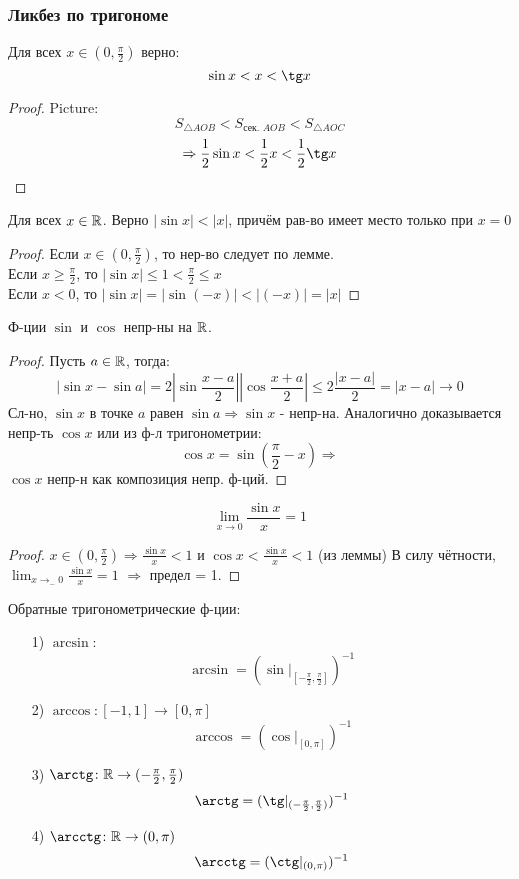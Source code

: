 \subsubsection{Ликбез по тригономе}
\begin{lemma}
Для всех $x \in (0, \frac{\pi}{2})$ верно:
\[
\sin x < x < \tg x
\]
\end{lemma}
\begin{proof}
Picture:
\[
S_{\triangle AOB} < S_{\text{сек. } AOB} < S_{\triangle AOC}
\]
\[
\Rightarrow \frac{1}{2}\sin x < \frac{1}{2} x < \frac{1}{2}\tg x
\]
\end{proof}
\begin{consequence}
Для всех $x \in \mathbb{R}$. Верно $\left|\sin x\right| < \left| x\right|$, причём рав-во имеет место только при $x = 0$
\end{consequence}
\begin{proof}
Если $x \in (0, \frac{\pi}{2})$, то нер-во следует по лемме. \\
Если $x \geq \frac{\pi}{2}$, то $\left|\sin x\right| \leq 1 < \frac{\pi}{2} \leq x$ \\
Если $x < 0$, то $\left|\sin x\right| = \left|\sin (-x)\right| < \left| (-x)\right| = \left| x\right|$
\end{proof}
\begin{consequence}
Ф-ции $\sin$ и $\cos$ непр-ны на $\mathbb{R}$.
\end{consequence}
\begin{proof}
Пусть $a \in \mathbb{R}$, тогда:
\[
\left|\sin x - \sin a\right| = 2\left|\sin \frac{x - a}{2}\right|\left|\cos \frac{x + a}{2}\right| \leq 2\frac{\left|x - a\right|}{2} = \left|x - a\right| \rightarrow 0
\]
Сл-но, $\sin x$ в точке $a$ равен $\sin a \Rightarrow \sin x$ - непр-на. Аналогично доказывается непр-ть $\cos x$ или из ф-л тригонометрии:
\[
  \cos x = \sin(\frac{\pi}{2} - x) \Rightarrow
\]
$\cos x$ непр-н как композиция непр. ф-ций.
\end{proof}
\begin{consequence}
\[
\lim_{x\to 0} \frac{\sin x}{x} = 1
\]
\end{consequence}
\begin{proof}
$x \in (0, \frac{\pi}{2}) \Rightarrow \frac{\sin x}{x} < 1$ и $\cos x < \frac{\sin x}{x} < 1$ (из леммы)
В силу чётности, $\lim_{x\to_-0} \frac{\sin x}{x} = 1$ $\Rightarrow$ предел = 1. 
\end{proof}
\begin{definition}
Обратные тригонометрические ф-ции:
\begin{itemize}
  \item [1) ] $\arcsin$:
    \[
    \arcsin = (\sin|_{[-\frac{\pi}{2}, \frac{\pi}{2}]})^{-1}
    \]
  \item [2) ] $\arccos \colon [-1, 1] \rightarrow [0, \pi]$
    \[
    \arccos = (\cos|_{[0, \pi]})^{-1}
    \]
  \item[3) ] $\arctg \colon \R \rightarrow (-\frac{\pi}{2}, \frac{\pi}{2})$
    \[
    \arctg = (\tg|_{(-\frac{\pi}{2}, \frac{\pi}{2})})^{-1}
    \]
  \item [4) ] $\arcctg \colon \R \rightarrow (0, \pi)$
    \[
    \arcctg = (\ctg|_{(0, \pi)})^{-1}
    \]
\end{itemize}
\end{definition}
